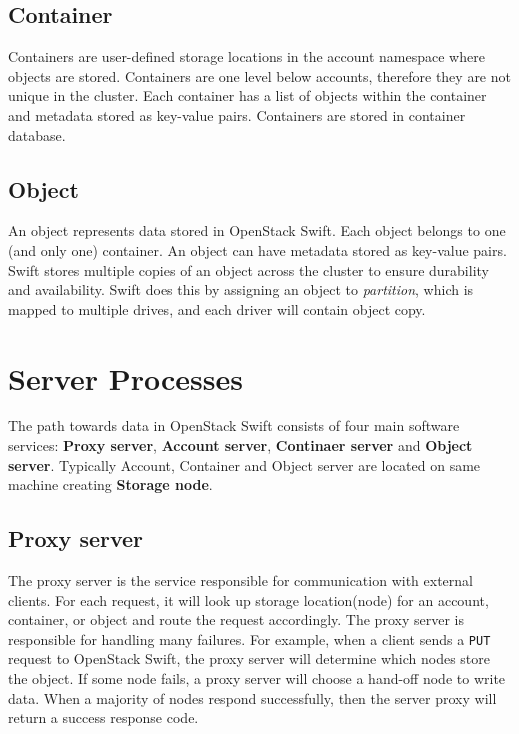    \subsection{Container}
    Containers are user-defined storage locations in the account namespace where objects are stored. Containers are one level below accounts, therefore they are not unique in the cluster. Each container has a list of objects within the container and metadata stored as key-value pairs. Containers are stored in container database\cite{swiftOpenStackSwift}.

    \subsection{Object}
    An object represents data stored in OpenStack Swift. Each object belongs to one (and only one) container. An object can have metadata stored as key-value pairs. Swift stores multiple copies of an object across the cluster to ensure durability and availability. Swift does this by assigning an object to \textit{partition}, which is mapped to multiple drives, and each driver will contain object copy\cite{swiftOpenStackSwift}.

    \section{Server Processes}
    The path towards data in OpenStack Swift consists of four main software services: \textbf{Proxy server}, \textbf{Account server}, \textbf{Continaer server} and \textbf{Object server}. Typically Account, Container and Object server are located on same machine creating \textbf{Storage node}.

    \subsection{Proxy server}
    The proxy server is the service responsible for communication with external clients. For each request, it will look up storage location(node) for an account, container, or object and route the request accordingly\cite{SwiftArchitecturalOverview}. The proxy server is responsible for handling many failures. For example, when a client sends a \texttt{PUT} request to OpenStack Swift, the proxy server will determine which nodes store the object. If some node fails, a proxy server will choose a hand-off node to write data. When a majority of nodes respond successfully, then the server proxy will return a success response code\cite{swiftOpenStackSwift}.

